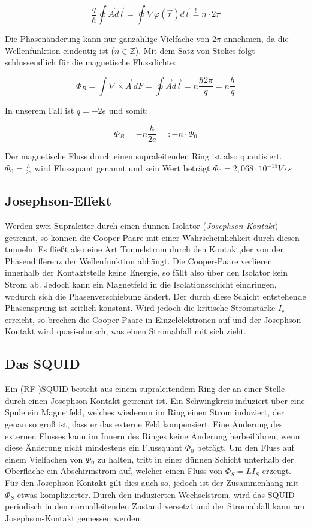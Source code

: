 $$\frac{q}{\hbar}\oint \vec A d\vec l = \oint \nabla \varphi(\vec r) d\vec l \stackrel{!}{=} n\cdot2\pi$$

Die Phasenänderung kann nur ganzahlige Vielfache von $2\pi$ annehmen, da die Wellenfunktion eindeutig ist ($n \in \mathbb Z$). Mit dem Satz von Stokes folgt schlussendlich für die magnetische Flussdichte:

$$ \Phi_B = \int \nabla \times \vec A \ dF = \oint \vec A d\vec l = n\frac{\hbar 2\pi}{q} = n\frac{h}{q} $$

In unserem Fall ist $q=-2e$ und somit:

$$\Phi_B = -n\frac{h}{2e} =: -n\cdot \Phi_0$$

Der magnetische Fluss durch einen supraleitenden Ring ist also quantisiert. $\Phi_0 = \frac{h}{2e}$ wird Flussquant genannt und sein Wert beträgt $\Phi_0 = 2,068 \cdot 10^{-15} V\cdot s$

\subsection{Josephson-Effekt}

Werden zwei Supraleiter durch einen dünnen Isolator (\emph{Josephson-Kontakt}) getrennt, so können die Cooper-Paare mit einer Wahrscheinlichkeit durch diesen tunneln. Es fließt also eine Art Tunnelstrom durch den Kontakt,der von der Phasendifferenz der Wellenfunktion abhängt. Die Cooper-Paare verlieren innerhalb der Kontaktstelle keine Energie, so fällt also über den Isolator kein Strom ab. Jedoch kann ein Magnetfeld in die Isolationsschicht eindringen, wodurch sich die Phasenverschiebung ändert. Der durch diese Schicht entstehende Phasensprung ist zeitlich konstant. Wird jedoch die kritische Stromstärke $I_c$ erreicht, so brechen die Cooper-Paare in Einzelelektronen auf und der Josephson-Kontakt wird quasi-ohmsch, was einen Stromabfall mit sich zieht.

\subsection{Das SQUID}

Ein (RF-)SQUID besteht aus einem supraleitendem Ring der an einer Stelle durch einen Josephson-Kontakt getrennt ist. Ein Schwingkreis induziert über eine Spule ein Magnetfeld, welches wiederum im Ring einen Strom induziert, der genau so groß ist, dass er das externe Feld kompensiert. Eine Änderung des externen Flusses kann im Innern des Ringes keine Änderung herbeiführen, wenn diese Änderung nicht mindestens ein Flussquant $\Phi_0$ beträgt. Um den Fluss auf einem Vielfachen von $\Phi_0$ zu halten, tritt in einer dünnen Schicht unterhalb der Oberfläche ein Abschirmstrom auf, welcher einen Fluss von $\Phi_S = LI_S$ erzeugt. Für den Josephson-Kontakt gilt dies auch so, jedoch ist der Zusammenhang mit $\Phi_S$ etwas komplizierter. Durch den induzierten Wechselstrom, wird das SQUID periodisch in den normalleitenden Zustand versetzt und der Stromabfall kann am Josephson-Kontakt gemessen werden.

